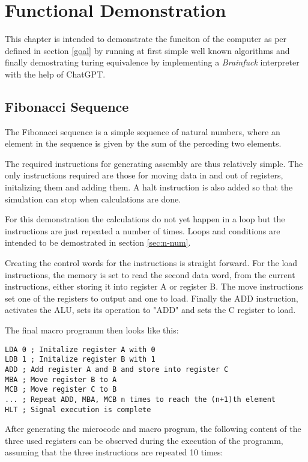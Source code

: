 \chapter{Functional Demonstration}
This chapter is intended to demonstrate the funciton of the computer as per defined in section \ref{goal} by running at first simple well known algorithms and finally demostrating turing equivalence by implementing a \textit{Brainfuck} interpreter with the help of ChatGPT.




\section{Fibonacci Sequence}
The Fibonacci sequence is a simple sequence of natural numbers, where an element in the sequence is given by the sum of the perceding two elements.

The required instructions for generating assembly are thus relatively simple. The only instructions required are those for moving data in and out of registers, initalizing them and adding them. A halt instruction is also added so that the simulation can stop when calculations are done. 

For this demonstration the calculations do not yet happen in a loop but the instructions are just repeated a number of times. Loops and conditions are intended to be demostrated in section \ref{sec:n-num}.

Creating the control words for the instructions is straight forward. For the load instructions, the memory is set to read the second data word, from the current instructions, either storing it into register A or register B. The move instructions set one of the registers to output and one to load. Finally the ADD instruction, activates the ALU, sets its operation to "ADD" and sets the C register to load. 

The final macro programm then looks like this: 
\begin{lstlisting}[language={[x86masm]Assembler}, caption=Assembly code to calculate assembly, label=lst:fib]
LDA 0 ; Initalize register A with 0
LDB 1 ; Initalize register B with 1
ADD ; Add register A and B and store into register C
MBA ; Move register B to A
MCB ; Move register C to B
... ; Repeat ADD, MBA, MCB n times to reach the (n+1)th element
HLT ; Signal execution is complete
\end{lstlisting}

After generating the microcode and macro program, the following content of the three used registers can be observed during the execution of the programm, assuming that the three instructions are repeated 10 times:

